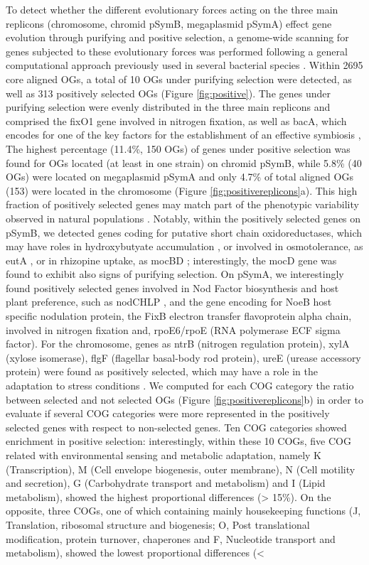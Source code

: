 To detect whether the different evolutionary forces acting on the three main replicons (chromosome, chromid pSymB, megaplasmid pSymA) effect gene evolution through purifying and positive selection, a genome-wide scanning for genes subjected to these evolutionary forces was performed following a general computational approach previously used in several bacterial species \cite{biswas2006genomic}\cite{petersen2007genes}. Within 2695 core aligned OGs, a total of 10 OGs under purifying selection were detected, as well as 313 positively selected OGs (Figure \ref{fig:positive}). The genes under purifying selection were evenly distributed in the three main replicons and comprised the fixO1 gene involved in nitrogen fixation, as well as bacA, which encodes for one of the key factors for the establishment of an effective symbiosis \cite{glazebrook1993rhizobium}, The highest percentage (11.4\%, 150 OGs) of genes under positive selection was found for OGs located (at least in one strain) on chromid pSymB, while 5.8\% (40 OGs) were located on megaplasmid pSymA and only 4.7\% of total aligned OGs (153) were located in the chromosome (Figure \ref{fig:positivereplicons}a). This high fraction of positively selected genes may match part of the phenotypic variability observed in natural populations \cite{biondi2009metabolic}. Notably, within the positively selected genes on pSymB, we detected genes coding for putative short chain oxidoreductases, which may have roles in hydroxybutyate accumulation \cite{jacob2008mutational}, or involved in osmotolerance, as eutA \cite{jebbar2005ectoine}, or in rhizopine uptake, as mocBD \cite{rossbach1994molecular}; interestingly, the mocD gene was found to exhibit also signs of purifying selection. On pSymA, we interestingly found positively selected genes involved in Nod Factor biosynthesis and host plant preference, such as nodCHLP \cite{roche1996common}, and the gene encoding for NoeB host specific nodulation protein, the FixB electron transfer flavoprotein alpha chain, involved in nitrogen fixation and, rpoE6/rpoE (RNA polymerase ECF sigma factor). For the chromosome, genes as ntrB (nitrogen regulation protein), xylA (xylose isomerase), flgF (flagellar basal-body rod protein), ureE (urease accessory protein) were found as positively selected, which may have a role in the adaptation to stress conditions \cite{bastiat2010dual}. We computed for each COG category the ratio between selected and not selected OGs (Figure \ref{fig:positivereplicons}b) in order to evaluate if several COG categories were more represented in the positively selected genes with respect to non-selected genes. Ten COG categories showed enrichment in positive selection: interestingly, within these 10 COGs, five COG related with environmental sensing and metabolic adaptation, namely K (Transcription), M (Cell envelope biogenesis, outer membrane), N (Cell motility and secretion), G (Carbohydrate transport and metabolism) and I (Lipid metabolism), showed the highest proportional differences (> 15\%). On the opposite, three COGs, one of which containing mainly housekeeping functions (J, Translation, ribosomal structure and biogenesis; O, Post translational modification, protein turnover, chaperones and F, Nucleotide transport and metabolism), showed the lowest proportional differences (< 